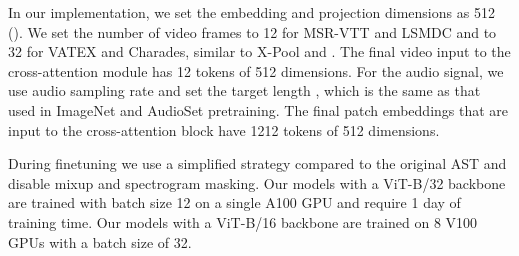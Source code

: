 \documentclass[10pt,twocolumn,letterpaper]{article}
\begin{document}
In our implementation, we set the embedding and projection dimensions as 512 ().  We set the number of video frames  to 12 for MSR-VTT and LSMDC and to 32 for VATEX and Charades, similar to X-Pool \cite{gorti2022xpool} and . The final video input to the cross-attention module has 12 tokens of 512 dimensions. For the audio signal, we use audio sampling rate  and set the target length , which is the same as that used in ImageNet and AudioSet pretraining. The final patch embeddings that are input to the cross-attention block have 1212 tokens of 512 dimensions.

During finetuning we use a simplified strategy compared to the original AST \cite{gong21b_interspeech} and disable mixup and spectrogram masking. Our models with a ViT-B/32 backbone are trained with batch size 12 on a single A100 GPU and require 1 day of training time. Our models with a ViT-B/16 backbone are trained on 8 V100 GPUs with a batch size of 32.


\begin{table}
\centering
{}
 \caption{Results on MSR-VTT 7k that confirm the potential of audio as an additional signal for the text-to-video retrieval task. By using audio without the corresponding video, we show that a correspondence between text and audio can be learned. M denotes Modalities. V and A represent Video and Audio, respectively.}
  \label{tab:a+v}
\end{table}
\end{document}
